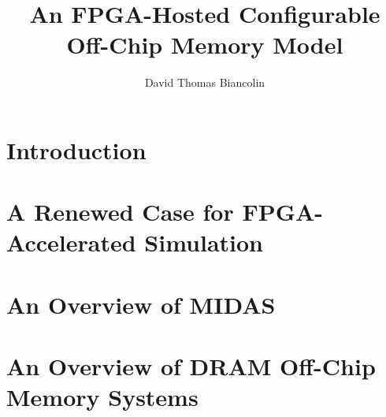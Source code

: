 \documentclass[masters]{ucbthesis}
\begin{document}

\title{An FPGA-Hosted Configurable Off-Chip Memory Model}
\author{David Thomas Biancolin}


%



\begin{frontmatter}


\setcounter{tocdepth}{2}
\setcounter{secnumdepth}{2}
\tableofcontents
\clearpage
\listoffigures
\clearpage
\listoftables

\begin{acknowledgements}
\end{acknowledgements}

\end{frontmatter}

\pagestyle{headings}


\chapter{Introduction}


\chapter{A Renewed Case for FPGA-Accelerated Simulation}


\chapter{An Overview of MIDAS}


\chapter{An Overview of DRAM Off-Chip Memory Systems}



\printbibliography
\end{document}
